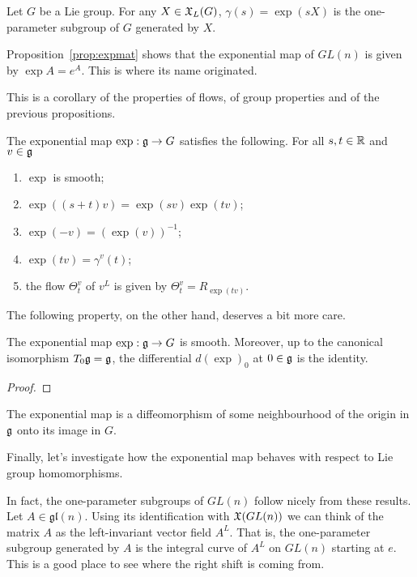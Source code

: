 \begin{exercise}
  Let $G$ be a Lie group. For any $X\in\mathfrak{X}_L(G)$, $\gamma(s) =\exp(sX)$ is the one-parameter subgroup of $G$ generated by $X$.
\end{exercise}

\begin{example}
  Proposition~\ref{prop:expmat} shows that the exponential map of $GL(n)$ is given by $\exp A = e^A$.
  This is where its name originated.
\end{example}

This is a corollary of the properties of flows, of group properties and of the previous propositions.
\begin{proposition}
  The exponential map $\exp: \mathfrak{g} \to G$ satisfies the following.
  For all $s,t\in\mathbb{R}$ and $v\in\mathfrak{g}$
  \begin{enumerate}
    \item $\exp$ is smooth;
    \item $\exp((s+t)v) = \exp(sv)\exp(tv)$;
    \item $\exp(-v) = (\exp(v))^{-1}$;
    \item $\exp(tv) =\gamma^v(t)$;
    \item the flow $\Theta_t^v$ of $v^L$ is given by $\Theta_t^v=R_{\exp(tv)}$.
  \end{enumerate}
\end{proposition}

The following property, on the other hand, deserves a bit more care.
\begin{theorem}
  The exponential map $\exp:\mathfrak{g}\to G$ is smooth.
  Moreover, up to the canonical isomorphism $T_0\mathfrak{g} = \mathfrak{g}$, the differential $d(\exp)_0$ at $0\in\mathfrak{g}$ is the identity.
\end{theorem}
\begin{proof}
\TODO  
\end{proof}
\begin{corollary}
  The exponential map is a diffeomorphism of some neighbourhood of the origin in $\mathfrak{g}$ onto its image in $G$.
\end{corollary}

Finally, let's investigate how the exponential map behaves with respect to Lie group homomorphisms.

\begin{proposition}
  \TODO
\end{proposition}

In fact, the one-parameter subgroups of $GL(n)$ follow nicely from these results.
Let $A\in\mathfrak{gl}(n)$. Using its identification with $\mathfrak{X}(GL(n))$ we can think of the matrix $A$ as the left-invariant vector field $A^L$.
That is, the one-parameter subgroup generated by $A$ is the integral curve of $A^L$ on $GL(n)$ starting at $e$.
This is a good place to see where the right shift is coming from.

